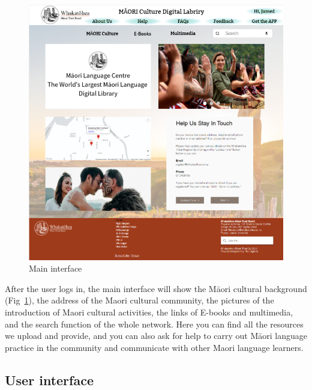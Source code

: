 \begin{figure}[htbp]
  \centerline{\includegraphics[width=400pt]{images/3-1-1.png}}
  \caption{Main interface}
  \label{fig30}
\end{figure}

After the user logs in, the main interface will show the Māori cultural background (Fig~\ref{fig30}), the address of the Maori cultural community, the pictures of the introduction of Maori cultural activities, the links of E-books and multimedia, and the search function of the whole network. Here you can find all the resources we upload and provide, and you can also ask for help to carry out Māori language practice in the community and communicate with other Maori language learners.

\subsection{User interface}

